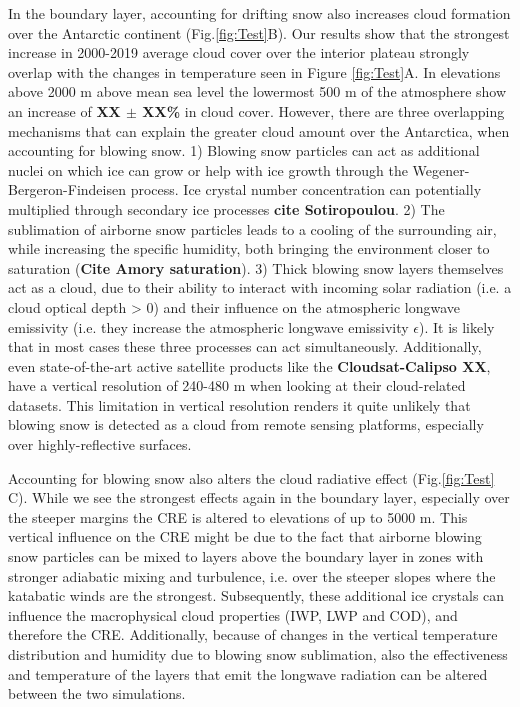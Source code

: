 \documentclass[12pt]{article}
\begin{document}
In the boundary layer, accounting for drifting snow also increases cloud formation over the Antarctic continent (Fig.\ref{fig:Test}B). Our results show that the strongest increase in 2000-2019 average cloud cover over the interior plateau strongly overlap with the changes in temperature seen in Figure \ref{fig:Test}A. In elevations above 2000 m above mean sea level the lowermost 500 m of the atmosphere show an increase of \textbf{XX $\pm$ XX\%} in cloud cover. However, there are three overlapping mechanisms that can explain the greater cloud amount over the Antarctica, when accounting for blowing snow. 1) Blowing snow particles can act as additional nuclei on which ice can grow or help with ice growth through the Wegener-Bergeron-Findeisen process. Ice crystal number concentration can potentially multiplied through secondary ice processes \textbf{cite Sotiropoulou}. 2) The sublimation of airborne snow particles leads to a cooling of the surrounding air, while increasing the specific humidity, both bringing the environment closer to saturation (\textbf{Cite Amory saturation}). 3) Thick blowing snow layers themselves act as a cloud, due to their ability to interact with incoming solar radiation (i.e. a cloud optical depth > 0) and their influence on the atmospheric longwave emissivity (i.e. they increase the atmospheric longwave emissivity $\epsilon$). It is likely that in most cases these three processes can act simultaneously. Additionally, even state-of-the-art active satellite products like the \textbf{Cloudsat-Calipso XX}, have a vertical resolution of 240-480 m when looking at their cloud-related datasets. This limitation in vertical resolution renders it quite unlikely that blowing snow is detected as a cloud from remote sensing platforms, especially over highly-reflective surfaces.

Accounting for blowing snow also alters the cloud radiative effect (Fig.\ref{fig:Test} C). While we see the strongest effects again in the boundary layer, especially over the steeper margins the CRE is altered to elevations of up to 5000 m. This vertical influence on the CRE might be due to the fact that airborne blowing snow particles can be mixed to layers above the boundary layer in zones with stronger adiabatic mixing and turbulence, i.e. over the steeper slopes where the katabatic winds are the strongest. Subsequently, these additional ice crystals can influence the macrophysical cloud properties (IWP, LWP and COD), and therefore the CRE. Additionally, because of changes in the vertical temperature distribution and humidity due to blowing snow sublimation, also the effectiveness and temperature of the layers that emit the longwave radiation can be altered between the two simulations. 
\end{document}
